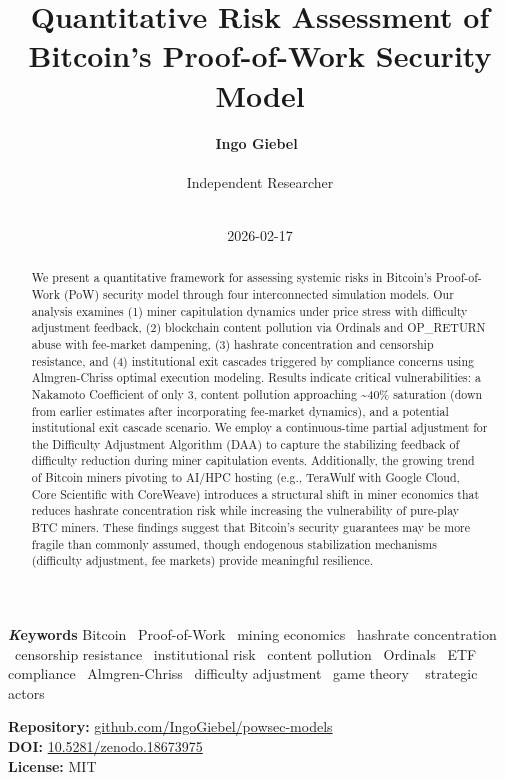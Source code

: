 \documentclass[
  11pt,
]{article}
\title{Quantitative Risk Assessment of Bitcoin's Proof-of-Work Security
Model}
\author{\textbf{Ingo
Giebel}~\orcidlink{0009-0005-4238-000X}\\\\Independent Researcher\\\\}
\date{2026-02-17}
\begin{document}
\maketitle
\begin{abstract}
We present a quantitative framework for assessing systemic risks in
Bitcoin's Proof-of-Work (PoW) security model through four interconnected
simulation models. Our analysis examines (1) miner capitulation dynamics
under price stress with difficulty adjustment feedback, (2) blockchain
content pollution via Ordinals and OP\_RETURN abuse with fee-market
dampening, (3) hashrate concentration and censorship resistance, and (4)
institutional exit cascades triggered by compliance concerns using
Almgren-Chriss optimal execution modeling. Results indicate critical
vulnerabilities: a Nakamoto Coefficient of only 3, content pollution
approaching \textasciitilde40\% saturation (down from earlier estimates
after incorporating fee-market dynamics), and a potential institutional
exit cascade scenario. We employ a continuous-time partial adjustment
for the Difficulty Adjustment Algorithm (DAA) to capture the stabilizing
feedback of difficulty reduction during miner capitulation events.
Additionally, the growing trend of Bitcoin miners pivoting to AI/HPC
hosting (e.g., TeraWulf with Google Cloud, Core Scientific with
CoreWeave) introduces a structural shift in miner economics that reduces
hashrate concentration risk while increasing the vulnerability of
pure-play BTC miners. These findings suggest that Bitcoin's security
guarantees may be more fragile than commonly assumed, though endogenous
stabilization mechanisms (difficulty adjustment, fee markets) provide
meaningful resilience.
\end{abstract}
{\bfseries \emph Keywords}
\def\sep{\textbullet\ }
Bitcoin \sep Proof-of-Work \sep mining economics \sep hashrate
concentration \sep censorship resistance \sep institutional
risk \sep content pollution \sep Ordinals \sep ETF
compliance \sep Almgren-Chriss \sep difficulty adjustment \sep game
theory \sep 
strategic actors

\ifdefined\Shaded\renewenvironment{Shaded}{\begin{tcolorbox}[borderline west={3pt}{0pt}{shadecolor}, boxrule=0pt, sharp corners, frame hidden, interior hidden, breakable, enhanced]}{\end{tcolorbox}}\fi

\textbf{Repository:}
\href{https://github.com/IngoGiebel/powsec-models}{github.com/IngoGiebel/powsec-models}\\
\textbf{DOI:}
\href{https://doi.org/10.5281/zenodo.18673975}{10.5281/zenodo.18673975}\\
\textbf{License:} MIT
\end{document}
